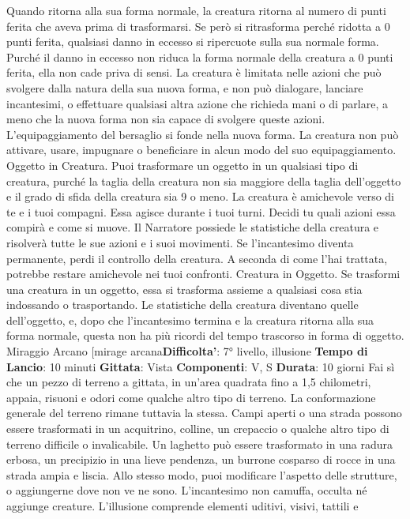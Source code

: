\begin{multicols}{2}
Quando ritorna alla sua forma normale, la creatura
ritorna al numero di punti ferita che aveva prima di
trasformarsi. Se però si ritrasforma perché ridotta a 0
punti ferita, qualsiasi danno in eccesso si ripercuote
sulla sua normale forma. Purché il danno in eccesso
non riduca la forma normale della creatura a 0 punti
ferita, ella non cade priva di sensi.
La creatura è limitata nelle azioni che può svolgere
dalla natura della sua nuova forma, e non può
dialogare, lanciare incantesimi, o effettuare qualsiasi
altra azione che richieda mani o di parlare, a meno che
la nuova forma non sia capace di svolgere queste
azioni.
L’equipaggiamento del bersaglio si fonde nella nuova
forma. La creatura non può attivare, usare, impugnare o
beneficiare in alcun modo del suo equipaggiamento.
Oggetto in Creatura. Puoi trasformare un oggetto in un
qualsiasi tipo di creatura, purché la taglia della creatura
non sia maggiore della taglia dell’oggetto e il grado di
sfida della creatura sia 9 o meno. La creatura è
amichevole verso di te e i tuoi compagni. Essa agisce
durante i tuoi turni. Decidi tu quali azioni essa compirà e
come si muove. Il Narratore possiede le statistiche della
creatura e risolverà tutte le sue azioni e i suoi
movimenti.
Se l’incantesimo diventa permanente, perdi il controllo
della creatura. A seconda di come l’hai trattata,
potrebbe restare amichevole nei tuoi confronti.
Creatura in Oggetto. Se trasformi una creatura in un
oggetto, essa si trasforma assieme a qualsiasi cosa stia
indossando o trasportando. Le statistiche della creatura
diventano quelle dell’oggetto, e, dopo che l’incantesimo
termina e la creatura ritorna alla sua forma normale,
questa non ha più ricordi del tempo trascorso in forma
di oggetto.
Miraggio Arcano
[mirage arcana\textbf{Difficolta'}:
7° livello, illusione
\textbf{Tempo di Lancio}: 10 minuti
\textbf{Gittata}: Vista
\textbf{Componenti}: V, S
\textbf{Durata}: 10 giorni
Fai sì che un pezzo di terreno a gittata, in un’area
quadrata fino a 1,5 chilometri, appaia, risuoni e odori
come qualche altro tipo di terreno. La conformazione
generale del terreno rimane tuttavia la stessa. Campi
aperti o una strada possono essere trasformati in un
acquitrino, colline, un crepaccio o qualche altro tipo di
terreno difficile o invalicabile. Un laghetto può essere
trasformato in una radura erbosa, un precipizio in una
lieve pendenza, un burrone cosparso di rocce in una
strada ampia e liscia.
Allo stesso modo, puoi modificare l’aspetto delle
strutture, o aggiungerne dove non ve ne sono.
L’incantesimo non camuffa, occulta né aggiunge
creature.
L’illusione comprende elementi uditivi, visivi, tattili e

\end{multicols}

